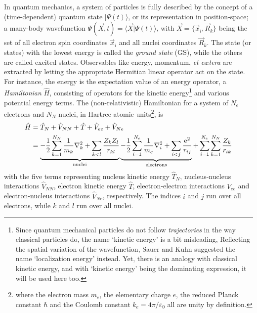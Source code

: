 \documentclass[11pt,bibliography=totoc,index=totoc]{scrbook}   %
\newcommand{\comment}[1]{\hl{#1}}
\begin{document}

In quantum mechanics, a system of particles is fully described by the concept of a (time-dependent) quantum state $|\Psi(t)\rangle$, 
or its representation in position-space; a many-body wavefunction $\Psi(\vec{X},t)=\langle\vec{X}|\Psi(t)\rangle$, with $\vec{X}=\{\vec{x}_i,\vec{R}_k\}$ being the set of all electron spin coordinates $\vec{x}_i$ and all nuclei coordinates $\vec{R}_k$.
The state (or states) with the lowest energy is called the \emph{ground state} (GS), while the others are called excited states. 
Observables like energy, momentum, \textit{et cætera} are extracted by letting the appropriate Hermitian linear operator act on the state. 
For instance, the energy is the expectation value of an energy operator, a \emph{Hamiltonian} $\hat{H}$, 
consisting of operators for the kinetic energy\footnote{Since quantum mechanical particles do not follow \emph{trajectories} in the way classical particles do, the name `kinetic energy' is a bit misleading, Reflecting the spatial variation of the wavefunction, Sauer and Kuhn suggested the name `localization energy' instead\cite{Sauer:1982}. Yet, there is an analogy with classical kinetic energy, and with `kinetic energy' being the dominating expression, it will be used here too.} and various potential energy terms.
The (non-relativistic) Hamiltonian for a system of $N_e$ electrons and $N_N$ nuclei, in Hartree atomic units\footnote{
where the electron mass $m_e$, the elementary charge $e$, the reduced Planck constant $\hbar$ and the Coulomb constant $k_e=4\pi/\varepsilon_0$ all are unity by definition.
}, is
\begin{align}
  \hat{H} &= \hat{T}_N + \hat{V}_{NN} + \hat{T} + \hat{V}_{ee} + \hat{V}_{Ne}\\
    &= \underbrace{
        - \frac{1}{2}\sum_{k=1}^{N_N} \frac{1}{m_k}\nabla_k^2 
        + \sum_{k<l}\frac{Z_kZ_l}{r_{kl}}
		}_{\text{nuclei}}
  \underbrace{
      -\frac{1}{2}\sum_{i=1}^{N_e}\frac{1}{m_e}\nabla_i^2
	+ \sum_{i<j}\frac{\mathrm{e}^2}{r_{ij}}
	}_{\text{electrons}}
    + \sum_{i=1}^{N_e}\sum_{k=1}^{N_N} \frac{Z_k}{r_{ik}}
  \label{eq:mol-hamiltonian}
\end{align}
with the five terms representing nucleus kinetic energy $\hat{T}_N$, nucleus-nucleus interactions $\hat{V}_{NN}$, electron kinetic energy $\hat{T}$, electron-electron interactions $\hat{V}_{ee}$ and electron-nucleus interactions $\hat{V}_{Ne}$, respectively.
The indices $i$ and $j$ run over all electrons, while $k$ and $l$ run over all nuclei. 
\end{document}
